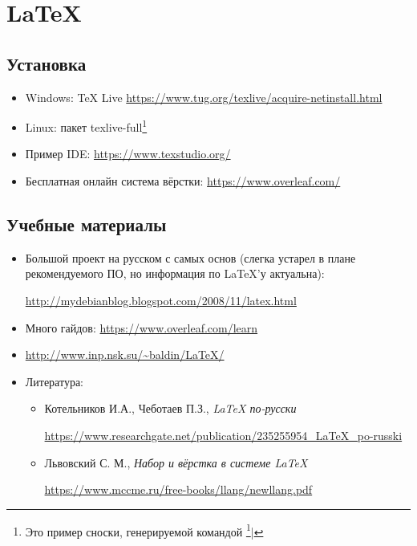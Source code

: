 \chapter{\LaTeX}\label{ch:latex}

\section{Установка}


\begin{itemize}
	\setlength{\itemsep}{1pt}%
	\setlength{\parskip}{1pt}%
	\item Windows: TeX Live \href{https://www.tug.org/texlive/acquire-netinstall.html}{https://www.tug.org/texlive/acquire-netinstall.html}
	\item Linux: пакет texlive-full\footnote{Это пример сноски, генерируемой командой \texttt{\footnote{...}}| }
	\item Пример IDE: \href{https://www.texstudio.org/}{https://www.texstudio.org/}
	\item Бесплатная онлайн система вёрстки: \href{https://www.overleaf.com/}{https://www.overleaf.com/}
\end{itemize}

\section{Учебные материалы}

\begin{itemize}
	\item Большой проект на русском с самых основ (слегка устарел в плане рекомендуемого ПО, но информация по \LaTeX'у актуальна):
	
	 \href{http://mydebianblog.blogspot.com/2008/11/latex.html}{http://mydebianblog.blogspot.com/2008/11/latex.html}
	 \item Много гайдов: \href{https://www.overleaf.com/learn}{https://www.overleaf.com/learn}
	\item \href{http://www.inp.nsk.su/~baldin/LaTeX/}{http://www.inp.nsk.su/\textasciitilde baldin/LaTeX/}
	\item Литература:
	\begin{itemize}
		\item Котельников И.А., Чеботаев П.З., \textit{LaTeX по-русски }
		
		\href{https://www.researchgate.net/publication/235255954_LaTeX_po-russki}{\small https://www.researchgate.net/publication/235255954\_LaTeX\_po-russki}
		
		\item Львовский С. М., \textit{Набор и вёрстка в системе \LaTeX}
		
		 \href{https://www.mccme.ru/free-books/llang/newllang.pdf}{\small https://www.mccme.ru/free-books/llang/newllang.pdf}
	\end{itemize}
\end{itemize}

